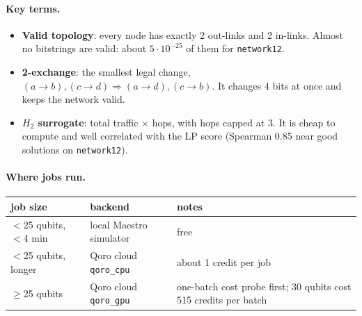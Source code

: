 \documentclass[11pt]{article}
\begin{document}
\paragraph{Key terms.}
\begin{itemize}
\item \textbf{Valid topology}: every node has exactly 2 out-links and 2 in-links. Almost no
  bitstrings are valid: about $5\cdot10^{-25}$ of them for \texttt{network12}.
\item \textbf{2-exchange}: the smallest legal change, $(a\!\to\!b),(c\!\to\!d)\Rightarrow
  (a\!\to\!d),(c\!\to\!b)$. It changes 4 bits at once and keeps the network valid.
\item \textbf{$H_2$ surrogate}: total traffic $\times$ hops, with hops capped at 3. It is cheap to compute and
  well correlated with the LP score (Spearman 0.85 near good solutions on \texttt{network12}).
\end{itemize}

\paragraph{Where jobs run.}
\begin{center}\small
\begin{tabularx}{\textwidth}{@{}llL@{}}
\toprule
job size & backend & notes\\
\midrule
$<$25 qubits, $<$4 min & local Maestro simulator & free\\
$<$25 qubits, longer & Qoro cloud \texttt{qoro\_cpu} & about 1 credit per job\\
$\ge$25 qubits & Qoro cloud \texttt{qoro\_gpu} & one-batch cost probe first; 30 qubits cost 515 credits per batch\\
\bottomrule
\end{tabularx}
\end{center}

\end{document}
